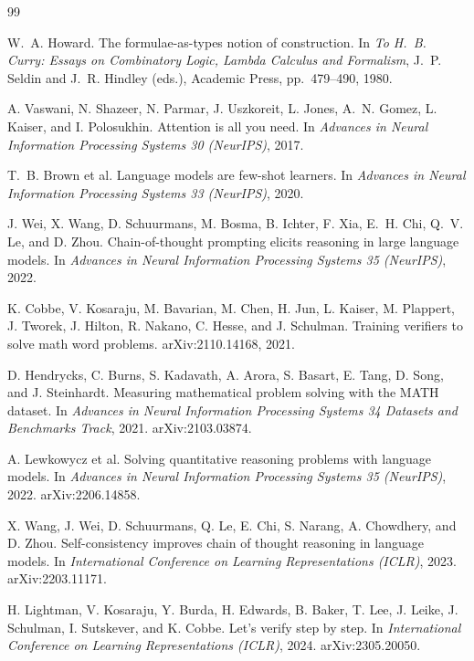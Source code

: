 \documentclass[11pt]{article}
\theoremstyle{definition}
\theoremstyle{plain}
\theoremstyle{remark}
\begin{document}
\begin{thebibliography}{99}\small

W.~A. Howard.
The formulae-as-types notion of construction.
In \emph{To H.~B. Curry: Essays on Combinatory Logic, Lambda Calculus and Formalism},
J.~P. Seldin and J.~R. Hindley (eds.), Academic Press, pp.~479--490, 1980.

A. Vaswani, N. Shazeer, N. Parmar, J. Uszkoreit, L. Jones, A.~N. Gomez, L. Kaiser, and
I. Polosukhin.
Attention is all you need.
In \emph{Advances in Neural Information Processing Systems 30 (NeurIPS)}, 2017.

T.~B. Brown et al.
Language models are few-shot learners.
In \emph{Advances in Neural Information Processing Systems 33 (NeurIPS)}, 2020.

J. Wei, X. Wang, D. Schuurmans, M. Bosma, B. Ichter, F. Xia, E.~H. Chi, Q.~V. Le, and
D. Zhou.
Chain-of-thought prompting elicits reasoning in large language models.
In \emph{Advances in Neural Information Processing Systems 35 (NeurIPS)}, 2022.

K. Cobbe, V. Kosaraju, M. Bavarian, M. Chen, H. Jun, L. Kaiser, M. Plappert, J. Tworek,
J. Hilton, R. Nakano, C. Hesse, and J. Schulman.
Training verifiers to solve math word problems.
arXiv:2110.14168, 2021.

D. Hendrycks, C. Burns, S. Kadavath, A. Arora, S. Basart, E. Tang, D. Song, and J. Steinhardt.
Measuring mathematical problem solving with the MATH dataset.
In \emph{Advances in Neural Information Processing Systems 34 Datasets and Benchmarks Track},
2021. arXiv:2103.03874.

A. Lewkowycz et al.
Solving quantitative reasoning problems with language models.
In \emph{Advances in Neural Information Processing Systems 35 (NeurIPS)}, 2022.
arXiv:2206.14858.

X. Wang, J. Wei, D. Schuurmans, Q. Le, E. Chi, S. Narang, A. Chowdhery, and D. Zhou.
Self-consistency improves chain of thought reasoning in language models.
In \emph{International Conference on Learning Representations (ICLR)}, 2023.
arXiv:2203.11171.

H. Lightman, V. Kosaraju, Y. Burda, H. Edwards, B. Baker, T. Lee, J. Leike, J. Schulman,
I. Sutskever, and K. Cobbe.
Let's verify step by step.
In \emph{International Conference on Learning Representations (ICLR)}, 2024.
arXiv:2305.20050.


\end{thebibliography}
\end{document}

